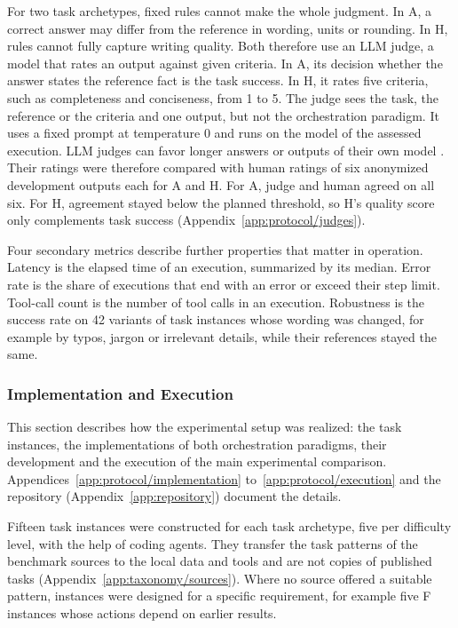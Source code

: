 For two task archetypes, fixed rules cannot make the whole judgment. In A, a correct answer may differ from the reference in wording, units or rounding. In H, rules cannot fully capture writing quality. Both therefore use an LLM judge, a model that rates an output against given criteria. In A, its decision whether the answer states the reference fact is the task success. In H, it rates five criteria, such as completeness and conciseness, from 1 to 5. The judge sees the task, the reference or the criteria and one output, but not the orchestration paradigm. It uses a fixed prompt at temperature 0 and runs on the model of the assessed execution. LLM judges can favor longer answers or outputs of their own model \parencite{zhengJudgingLLMasaJudgeMTBench2023}. Their ratings were therefore compared with human ratings of six anonymized development outputs each for A and H. For A, judge and human agreed on all six. For H, agreement stayed below the planned threshold, so H's quality score only complements task success (Appendix~\ref{app:protocol/judges}).

Four secondary metrics describe further properties that matter in operation. Latency is the elapsed time of an execution, summarized by its median. Error rate is the share of executions that end with an error or exceed their step limit. Tool-call count is the number of tool calls in an execution. Robustness is the success rate on 42 variants of task instances whose wording was changed, for example by typos, jargon or irrelevant details, while their references stayed the same.

\subsubsection{Implementation and Execution}
\label{subsubsec:TADF/paradigms}
This section describes how the experimental setup was realized: the task instances, the implementations of both orchestration paradigms, their development and the execution of the main experimental comparison. Appendices~\ref{app:protocol/implementation} to~\ref{app:protocol/execution} and the repository (Appendix~\ref{app:repository}) document the details.

Fifteen task instances were constructed for each task archetype, five per difficulty level, with the help of coding agents. They transfer the task patterns of the benchmark sources to the local data and tools and are not copies of published tasks (Appendix~\ref{app:taxonomy/sources}). Where no source offered a suitable pattern, instances were designed for a specific requirement, for example five F instances whose actions depend on earlier results.


